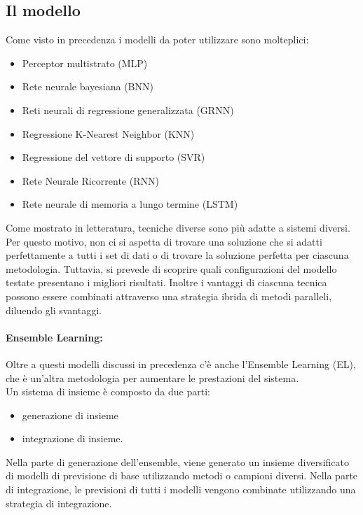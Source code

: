 \documentclass[12pt,a4paper]{report}
\begin{document}
\subsection{Il modello}
Come visto in precedenza i modelli da poter utilizzare sono molteplici:
\begin{itemize}
    \item Perceptor multistrato (MLP)
    \item Rete neurale bayesiana (BNN)
    \item Reti neurali di regressione generalizzata (GRNN)
    \item Regressione K-Nearest Neighbor (KNN)
    \item Regressione del vettore di supporto (SVR)
    \item Rete Neurale Ricorrente (RNN)
    \item Rete neurale di memoria a lungo termine (LSTM)
\end{itemize}

Come mostrato in letteratura, tecniche diverse sono più adatte a sistemi diversi. Per questo motivo, non ci si aspetta di trovare una soluzione che si adatti perfettamente a tutti i set di dati o di trovare la soluzione perfetta per ciascuna metodologia. Tuttavia, si prevede di scoprire quali configurazioni del modello testate presentano i migliori risultati.
Inoltre i vantaggi di ciascuna tecnica possono essere combinati attraverso una strategia ibrida di metodi paralleli, diluendo gli svantaggi.

\paragraph*{Ensemble Learning:}
Oltre a questi modelli discussi in precedenza c'è anche l'Ensemble Learning (EL), che è un'altra metodologia per aumentare le prestazioni del sistema.\\
Un sistema di insieme è composto da due parti: \cite{towards:demandForecast}
\begin{itemize}
    \item generazione di insieme
    \item integrazione di insieme.
\end{itemize}
Nella parte di generazione dell'ensemble, viene generato un insieme diversificato di modelli di previsione di base utilizzando metodi o campioni diversi. Nella parte di integrazione, le previsioni di tutti i modelli vengono combinate utilizzando una strategia di integrazione.\\
\end{document}
